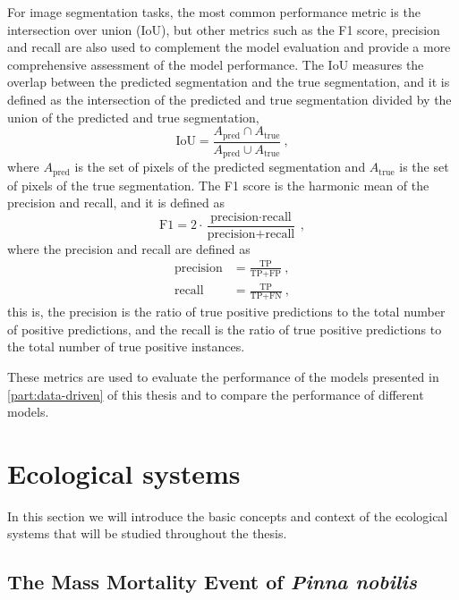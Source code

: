 For image segmentation tasks, the most common performance metric is the
intersection over union (IoU), but other metrics such as the F1 score,
precision and recall are also used to complement the model evaluation and
provide a more comprehensive assessment of the model performance. The IoU
measures the overlap between the predicted segmentation and the true
segmentation, and it is defined as the intersection of the predicted and true
segmentation divided by the union of the predicted and true segmentation,
\begin{equation}
  \text{IoU} = \frac{A_{\text{pred}} \cap A_{\text{true}}}{A_{\text{pred}} \cup
    A_{\text{true}}} \ ,
\end{equation}
where $A_{\text{pred}}$ is the set of pixels of the predicted segmentation and
$A_{\text{true}}$ is the set of pixels of the true segmentation. The F1 score
is the harmonic mean of the precision and recall, and it is defined as
\begin{equation}
  \text{F1} = 2\cdot\frac{\text{precision}\cdot\text{recall}}{\text{precision}
    +
    \text{recall}} \ ,
\end{equation}
where the precision and recall are defined as
\begin{align}
  \text{precision} & = \frac{\text{TP}}{\text{TP} + \text{FP}} \ , \\
  \text{recall}    & = \frac{\text{TP}}{\text{TP} + \text{FN}} \ ,
\end{align}
this is, the precision is the ratio of true positive predictions to the total
number of positive predictions, and the recall is the ratio of true positive
predictions to the total number of true positive instances.

These metrics are used to evaluate the performance of the models presented in
\cref{part:data-driven} of this thesis and to compare the performance of
different models.

\section{\label{sec:Ecological systems} Ecological
  systems}

In this section we will introduce the basic concepts and context of the
ecological systems that will be studied throughout the thesis.

\subsection{\label{sec:The Mass Mortality Event of Pinna nobilis} The Mass
  Mortality Event of \textit{Pinna nobilis}}

